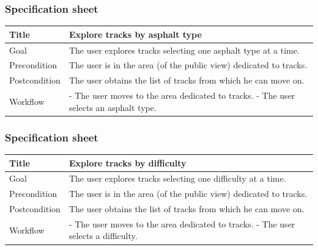 \documentclass{beamer}
\begin{document}
\begin{frame}
    \frametitle{Specification sheet}
    \begin{table}
        \tiny
        \begin{tabular}{|p{2cm}|p{6cm}|}
        \hline
        Title & \textbf{Explore tracks by asphalt type} \\
        \hline
        Goal & The user explores tracks selecting one asphalt type at a time. \\
        \hline
        Precondition & The user is in the area (of the public view) dedicated to tracks.\\
        \hline
        Postcondition & The user obtains the list of tracks from which he can move on.\\
        \hline
        Workflow &
        - The user moves to the area dedicated to tracks. \newline
        - The user selects an asphalt type. \\
        \hline
        \end{tabular}
\end{table}
\end{frame}

\begin{frame}
    \frametitle{Specification sheet}
    \begin{table}
        \tiny
        \begin{tabular}{|p{2cm}|p{6cm}|}
        \hline
        Title & \textbf{Explore tracks by difficulty} \\
        \hline
        Goal & The user explores tracks selecting one difficulty at a time. \\
        \hline
        Precondition & The user is in the area (of the public view) dedicated to tracks.\\
        \hline
        Postcondition & The user obtains the list of tracks from which he can move on.\\
        \hline
        Workflow &
        - The user moves to the area dedicated to tracks. \newline
        - The user selects a difficulty. \\
        \hline
        \end{tabular}
\end{table}
\end{frame}
\end{document}
